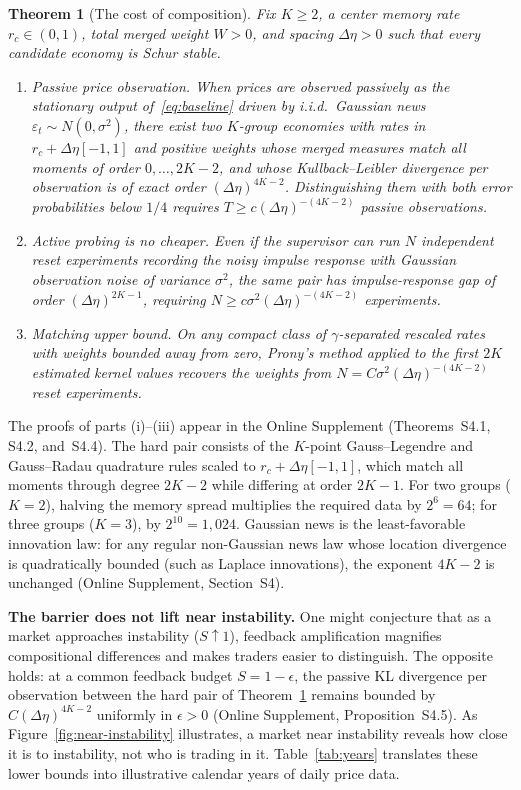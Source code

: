 \documentclass[11pt,letterpaper]{article}
\newtheorem{theorem}{Theorem}[section]
\theoremstyle{definition}
\begin{document}
\begin{theorem}[The cost of composition]\label{thm:cost}
Fix $K \ge 2$, a center memory rate $r_c \in (0,1)$, total merged weight $W > 0$, and spacing $\Delta\eta > 0$ such that every candidate economy is Schur stable.
\begin{enumerate}
  \item[(i)] \emph{Passive price observation.} When prices are observed passively as the stationary output of~\eqref{eq:baseline} driven by i.i.d.\ Gaussian news $\varepsilon_t \sim N(0, \sigma^2)$, there exist two $K$-group economies with rates in $r_c + \Delta\eta[-1,1]$ and positive weights whose merged measures match all moments of order $0, \dots, 2K-2$, and whose Kullback--Leibler divergence per observation is of exact order $(\Delta\eta)^{4K-2}$. Distinguishing them with both error probabilities below $1/4$ requires $T \ge c (\Delta\eta)^{-(4K-2)}$ passive observations.
  \item[(ii)] \emph{Active probing is no cheaper.} Even if the supervisor can run $N$ independent reset experiments recording the noisy impulse response with Gaussian observation noise of variance $\sigma^2$, the same pair has impulse-response gap of order $(\Delta\eta)^{2K-1}$, requiring $N \ge c \sigma^2 (\Delta\eta)^{-(4K-2)}$ experiments.
  \item[(iii)] \emph{Matching upper bound.} On any compact class of $\gamma$-separated rescaled rates with weights bounded away from zero, Prony's method applied to the first $2K$ estimated kernel values recovers the weights from $N = C \sigma^2 (\Delta\eta)^{-(4K-2)}$ reset experiments.
\end{enumerate}
\end{theorem}

The proofs of parts (i)--(iii) appear in the Online Supplement (Theorems~S4.1, S4.2, and~S4.4). The hard pair consists of the $K$-point Gauss--Legendre and Gauss--Radau quadrature rules scaled to $r_c + \Delta\eta[-1,1]$, which match all moments through degree $2K-2$ while differing at order $2K-1$. For two groups ($K=2$), halving the memory spread multiplies the required data by $2^6 = 64$; for three groups ($K=3$), by $2^{10} = 1{,}024$. Gaussian news is the least-favorable innovation law: for any regular non-Gaussian news law whose location divergence is quadratically bounded (such as Laplace innovations), the exponent $4K-2$ is unchanged (Online Supplement, Section~S4).

\textbf{The barrier does not lift near instability.} One might conjecture that as a market approaches instability ($S \uparrow 1$), feedback amplification magnifies compositional differences and makes traders easier to distinguish. The opposite holds: at a common feedback budget $S = 1 - \epsilon$, the passive KL divergence per observation between the hard pair of Theorem~\ref{thm:cost} remains bounded by $C(\Delta\eta)^{4K-2}$ uniformly in $\epsilon > 0$ (Online Supplement, Proposition~S4.5). As Figure~\ref{fig:near-instability} illustrates, a market near instability reveals how close it is to instability, not who is trading in it. Table~\ref{tab:years} translates these lower bounds into illustrative calendar years of daily price data.
\end{document}

